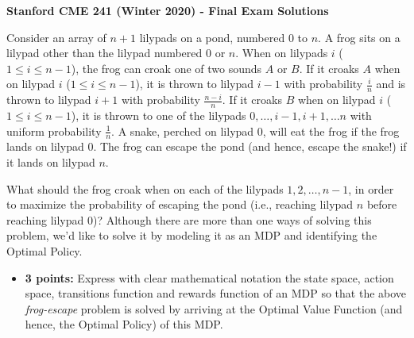 \documentclass[12pt]{exam}
\begin{document}
\begin{center}
{\large {\bf Stanford CME 241 (Winter 2020) - Final Exam Solutions}}

\end{center}
\vspace{5mm}
 
\begin{questions}
 Consider an array of $n+1$ lilypads on a pond, numbered $0$ to $n$. A frog sits on a lilypad other than the lilypad numbered $0$ or $n$.  When on lilypads $i$ ($1\leq i \leq n-1$), the frog can croak one of two sounds $A$ or
$B$. If it croaks $A$ when on lilypad $i$ ($1 \leq i \leq n-1$), it is thrown to lilypad $i-1$ with probability $\frac i n$ and is thrown to lilypad $i+1$ with probability $\frac {n-i} n$. If it croaks $B$ when on lilypad $i$ ($1\leq i \leq n-1$), it is thrown to one of the lilypads $0, \ldots, i-1, i+1, \ldots n$ with uniform probability $\frac 1 n$. A snake, perched on lilypad $0$, will eat the frog if the frog lands on lilypad $0$. The frog can escape the pond (and hence, escape the snake!) if it lands on lilypad $n$.

What should the frog croak when on each of the lilypads $1, 2, \ldots, n-1$, in order to maximize the probability of escaping the pond (i.e., reaching lilypad $n$ before reaching lilypad $0$)? Although there are more than one ways of solving this problem, we'd like to solve it by modeling it as an MDP and identifying the Optimal Policy.

\begin{itemize}
\item {\bf 3 points:} Express with clear mathematical notation the state space, action space, transitions function and rewards function of an MDP so that the above {\em frog-escape} problem is solved by arriving at the Optimal Value Function (and hence, the Optimal Policy) of this MDP.


\end{itemize}
\end{questions}
\end{document}
